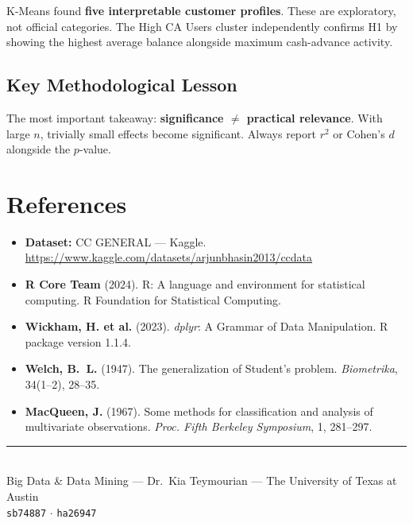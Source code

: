 \documentclass[12pt, letterpaper]{article}
\begin{document}
K-Means found \textbf{five interpretable customer profiles}. These are exploratory,
not official categories. The High CA Users cluster independently confirms H1 by
showing the highest average balance alongside maximum cash-advance activity.

\subsection{Key Methodological Lesson}

The most important takeaway: \textbf{significance $\neq$ practical relevance}.
With large $n$, trivially small effects become significant. Always report
$r^2$ or Cohen's $d$ alongside the $p$-value.

\section{References}

\begin{itemize}
  \item \textbf{Dataset:} CC GENERAL --- Kaggle.
    \url{https://www.kaggle.com/datasets/arjunbhasin2013/ccdata}
  \item \textbf{R Core Team} (2024). R: A language and environment for statistical
    computing. R Foundation for Statistical Computing.
  \item \textbf{Wickham, H. et al.} (2023). \textit{dplyr}: A Grammar of Data
    Manipulation. R package version 1.1.4.
  \item \textbf{Welch, B.~L.} (1947). The generalization of Student's problem.
    \textit{Biometrika}, 34(1--2), 28--35.
  \item \textbf{MacQueen, J.} (1967). Some methods for classification and analysis
    of multivariate observations. \textit{Proc. Fifth Berkeley Symposium}, 1, 281--297.
\end{itemize}

\vspace{2em}
\begin{center}
  \color{gray}\rule{0.5\linewidth}{0.4pt}\\[0.3em]
  {\small Big Data \& Data Mining --- Dr.\ Kia Teymourian ---
  The University of Texas at Austin}\\
  {\small \texttt{sb74887} $\cdot$ \texttt{ha26947}}
\end{center}
\end{document}
